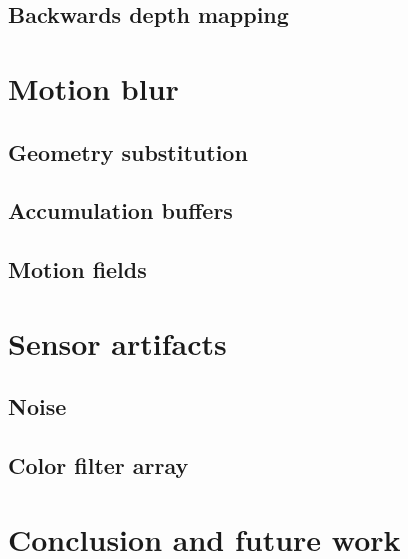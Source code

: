 \section{Backwards depth mapping}

\chapter{Motion blur}

\section{Geometry substitution}

\section{Accumulation buffers}

\section{Motion fields}

\chapter{Sensor artifacts}

\section{Noise}

\section{Color filter array}

\chapter{Conclusion and future work}